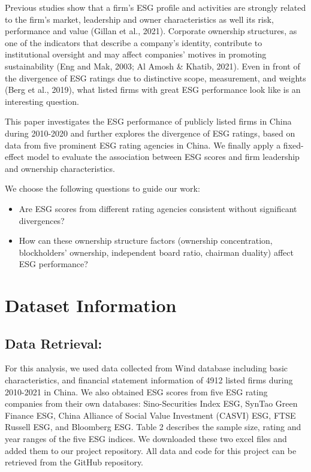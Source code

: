 \documentclass[
  12pt,
]{article}
\providecommand{\tightlist}{%
  \setlength{\itemsep}{0pt}\setlength{\parskip}{0pt}}
\begin{document}
Previous studies show that a firm's ESG profile and activities are
strongly related to the firm's market, leadership and owner
characteristics as well its risk, performance and value (Gillan et al.,
2021). Corporate ownership structures, as one of the indicators that
describe a company's identity, contribute to institutional oversight and
may affect companies' motives in promoting sustainability (Eng and Mak,
2003; Al Amosh \& Khatib, 2021). Even in front of the divergence of ESG
ratings due to distinctive scope, measurement, and weights (Berg et al.,
2019), what listed firms with great ESG performance look like is an
interesting question.

This paper investigates the ESG performance of publicly listed firms in
China during 2010-2020 and further explores the divergence of ESG
ratings, based on data from five prominent ESG rating agencies in China.
We finally apply a fixed-effect model to evaluate the association
between ESG scores and firm leadership and ownership characteristics.

We choose the following questions to guide our work:

\begin{itemize}
\tightlist
\item
  Are ESG scores from different rating agencies consistent without
  significant divergences?
\item
  How can these ownership structure factors (ownership concentration,
  blockholders' ownership, independent board ratio, chairman duality)
  affect ESG performance?
\end{itemize}

\newpage

\hypertarget{dataset-information}{%
\section{Dataset Information}\label{dataset-information}}

\hypertarget{data-retrieval}{%
\subsection{Data Retrieval:}\label{data-retrieval}}

For this analysis, we used data collected from Wind database including
basic characteristics, and financial statement information of 4912
listed firms during 2010-2021 in China. We also obtained ESG scores from
five ESG rating companies from their own databases: Sino-Securities
Index ESG, SynTao Green Finance ESG, China Alliance of Social Value
Investment (CASVI) ESG, FTSE Russell ESG, and Bloomberg ESG. Table 2
describes the sample size, rating and year ranges of the five ESG
indices. We downloaded these two excel files and added them to our
project repository. All data and code for this project can be retrieved
from the GitHub repository.
\end{document}
